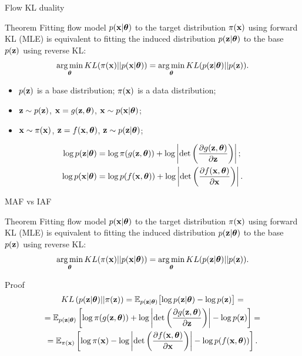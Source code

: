 \begin{frame}{Flow KL duality}
	\begin{block}{Theorem}
		Fitting flow model $p(\mathbf{x}| \boldsymbol{\theta})$ to the target distribution $\pi(\mathbf{x})$ using forward KL (MLE) is equivalent to fitting the induced distribution $p(\mathbf{z}| \boldsymbol{\theta})$ to the base $p(\mathbf{z})$ using reverse KL:
		\[
			\operatorname*{arg\,min}_{\boldsymbol{\theta}} KL(\pi(\mathbf{x}) || p(\mathbf{x} | \boldsymbol{\theta})) = \operatorname*{arg\,min}_{\boldsymbol{\theta}} KL(p(\mathbf{z} | \boldsymbol{\theta}) || p(\mathbf{z})).
		\]
		\vspace{-0.3cm}
		\begin{itemize}
			\item $p(\mathbf{z})$ is a base distribution; $\pi(\mathbf{x})$ is a data distribution;
			\item $\mathbf{z} \sim p(\mathbf{z})$, $\mathbf{x} = g(\mathbf{z}, \boldsymbol{\theta})$, $\mathbf{x} \sim p(\mathbf{x}| \boldsymbol{\theta})$;
			\item $\mathbf{x} \sim \pi(\mathbf{x})$, $\mathbf{z} = f(\mathbf{x}, \boldsymbol{\theta})$, $\mathbf{z} \sim p(\mathbf{z} | \boldsymbol{\theta})$;
		\end{itemize}
		\vspace{-0.3cm}
		\begin{align*}
			\log p(\mathbf{z} | \boldsymbol{\theta}) &= \log \pi(g(\mathbf{z}, \boldsymbol{\theta})) + \log \left| \det \left( \frac{\partial g(\mathbf{z}, \boldsymbol{\theta})}{\partial \mathbf{z}}\right) \right|; \\
			\log p(\mathbf{x} | \boldsymbol{\theta}) &= \log p(f(\mathbf{x}, \boldsymbol{\theta})) + \log \left| \det \left( \frac{\partial f(\mathbf{x}, \boldsymbol{\theta})}{\partial \mathbf{x}}\right) \right|.
		\end{align*}
	\end{block}
\end{frame}
\begin{frame}{MAF vs IAF}
	\begin{block}{Theorem}
		Fitting flow model $p(\mathbf{x}| \boldsymbol{\theta})$ to the target distribution $\pi(\mathbf{x})$ using forward KL (MLE) is equivalent to fitting the induced distribution $p(\mathbf{z}| \boldsymbol{\theta})$ to the base $p(\mathbf{z})$ using reverse KL:
		\[
			\operatorname*{arg\,min}_{\boldsymbol{\theta}} KL(\pi(\mathbf{x}) || p(\mathbf{x} | \boldsymbol{\theta})) = \operatorname*{arg\,min}_{\boldsymbol{\theta}} KL(p(\mathbf{z} | \boldsymbol{\theta}) || p(\mathbf{z})).
		\]
		\vspace{-0.5cm}
	\end{block}
	\begin{block}{Proof}
		\vspace{-0.5cm}
		\begin{multline*}
			KL\left(p(\mathbf{z} | \boldsymbol{\theta}) || \pi(\mathbf{z}) \right) = \mathbb{E}_{p(\mathbf{z} | \boldsymbol{\theta})} \bigl[ \log p(\mathbf{z} | \boldsymbol{\theta}) - \log p(\mathbf{z}) \bigr] = \\ 
			= \mathbb{E}_{p(\mathbf{z} | \boldsymbol{\theta})} \left[ \log \pi(g(\mathbf{z}, \boldsymbol{\theta})) + \log \left| \det \left( \frac{\partial g(\mathbf{z}, \boldsymbol{\theta})}{\partial \mathbf{z}}\right) \right| - \log p(\mathbf{z}) \right] = \\
			= \mathbb{E}_{\pi(\mathbf{x})} \left[ \log \pi(\mathbf{x}) - \log \left| \det \left( \frac{\partial f(\mathbf{x}, \boldsymbol{\theta})}{\partial \mathbf{x}}\right) \right| - \log p(f(\mathbf{x}, \boldsymbol{\theta})) \right].
		\end{multline*}
	\end{block}
\end{frame}
